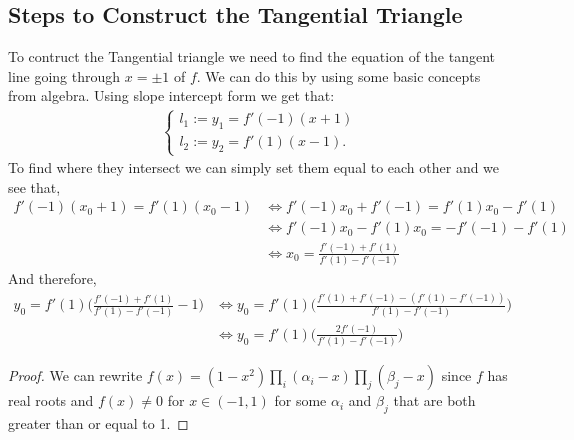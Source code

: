 \documentclass[12pt]{extreport}
\begin{document}
\subsection*{Steps to Construct the Tangential Triangle}
To contruct the Tangential triangle we need to find the equation of the tangent line going through $x = \pm 1$ of $f$. We can do this by using some basic concepts from algebra. Using slope intercept form we get that:
\begin{align*}
\left\{ \begin{array}{lr} l_1 := y_1 = f'(-1)(x+1) \\ l_2 := y_2 = f'(1)(x-1).\end{array} \right.
\end{align*}
To find where they intersect we can simply set them equal to each other and we see that,
\begin{align*}
f'(-1)(x_0+1) = f'(1)(x_0-1) &\iff f'(-1)x_0 + f'(-1) = f'(1)x_0 - f'(1) \\&\iff f'(-1)x_0 - f'(1)x_0 = -f'(-1) - f'(1) \\&\iff x_0 = \frac{f'(-1)+ f'(1)}{f'(1) - f'(-1)} 
\end{align*}
And therefore,
\begin{align*}
y_0 = f'(1) \Big(\frac{f'(-1)+ f'(1)}{f'(1) - f'(-1)} - 1\Big) &\iff
y_0 = f'(1) \Big(\frac{f'(1) + f'(-1) - (f'(1) - f'(-1))}{f'(1)-f'(-1)}\Big) \\&\iff
y_0 = f'(1)\Big(\frac{2f'(-1)}{f'(1)-f'(-1)}\Big)
\end{align*}

\begin{proof}
We can rewrite $f(x) = (1-x^2) \prod_{i}(\alpha_i - x) \prod_{j}(\beta_j - x)$ since $f$ has real roots and $f(x) \neq 0$ for $x \in (-1, 1)$ for some $\alpha_{i}$ and $\beta_{j}$ that are both greater than or equal to 1.
\end{proof}
\end{document}
